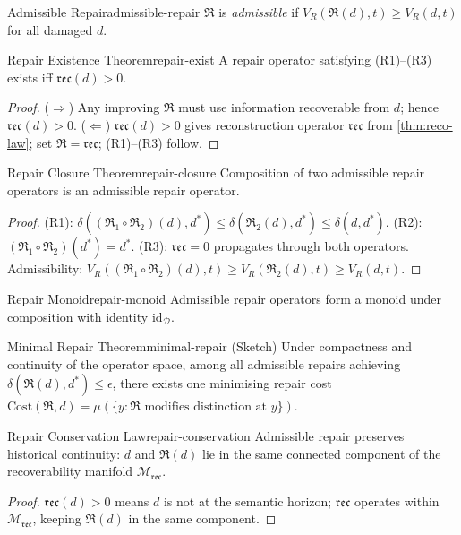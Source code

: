 \documentclass[12pt,twoside,openright]{book}
\newcommand{\repair}{\mathfrak{R}}
\newcommand{\reco}{\mathfrak{rec}}
\begin{document}
\begin{definition}{Admissible Repair}{admissible-repair}
  $\repair$ is \emph{admissible} if
  $V_R(\repair(d),t)\ge V_R(d,t)$ for all damaged $d$.
\end{definition}

\begin{theorem}{Repair Existence Theorem}{repair-exist}
  A repair operator satisfying (R1)--(R3) exists iff
  $\reco(d)>0$.
\end{theorem}
\begin{proof}
  ($\Rightarrow$) Any improving $\repair$ must use
  information recoverable from $d$; hence $\reco(d)>0$.
  ($\Leftarrow$) $\reco(d)>0$ gives reconstruction
  operator $\mathfrak{rec}$ from \cref{thm:reco-law};
  set $\repair=\mathfrak{rec}$; (R1)--(R3) follow.
\end{proof}

\begin{theorem}{Repair Closure Theorem}{repair-closure}
  Composition of two admissible repair operators is an
  admissible repair operator.
\end{theorem}
\begin{proof}
  (R1): $\delta((\repair_1\circ\repair_2)(d),d^*)
  \le\delta(\repair_2(d),d^*)\le\delta(d,d^*)$.
  (R2): $(\repair_1\circ\repair_2)(d^*)=d^*$.
  (R3): $\reco=0$ propagates through both operators.
  Admissibility: $V_R((\repair_1\circ\repair_2)(d),t)
  \ge V_R(\repair_2(d),t)\ge V_R(d,t)$.
\end{proof}

\begin{corollary}{Repair Monoid}{repair-monoid}
  Admissible repair operators form a monoid under
  composition with identity $\mathrm{id}_\mathcal{D}$.
\end{corollary}

\begin{theorem}{Minimal Repair Theorem}{minimal-repair}
  \textup{(Sketch)} Under compactness and continuity of
  the operator space, among all admissible repairs
  achieving $\delta(\repair(d),d^*)\le\epsilon$,
  there exists one minimising repair cost
  $\mathrm{Cost}(\repair,d)=
  \mu(\{y:\repair\text{ modifies distinction at }y\})$.
\end{theorem}

\begin{theorem}{Repair Conservation Law}{repair-conservation}
  Admissible repair preserves historical continuity:
  $d$ and $\repair(d)$ lie in the same connected
  component of the recoverability manifold $\mathcal{M}_\reco$.
\end{theorem}
\begin{proof}
  $\reco(d)>0$ means $d$ is not at the semantic horizon;
  $\mathfrak{rec}$ operates within $\mathcal{M}_\reco$,
  keeping $\repair(d)$ in the same component.
\end{proof}
\end{document}
